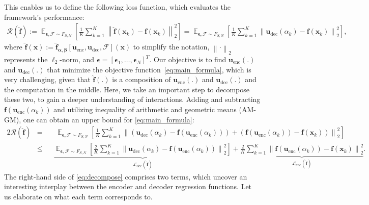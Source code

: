 \documentclass{article}
\def\enc{\mathbf{u}_\textrm{enc}}
\def\dec{\mathbf{u}_\textrm{dec}}
\def\lenc{\mathcal{L}_\textrm{enc}}
\def\ldec{\mathcal{L}_\textrm{dec}}
\def\func{\mathbf{f}}
\def\stset{\mathcal{F}}
\def\fhat{\mathbf{\hat{f}}}
\def\est{\fhat_{\bm{\alpha},\bm{\beta}}[\enc, \dec, \stset]}
\newcommand{\norm}[1]{\left\lVert#1\right\rVert}
\begin{document}
This enables us to define the following loss function, which evaluates the framework's performance:
\begin{align}\label{eq:main_formula}
    \mathcal{R}(\fhat) := \mathop{\mathbb{E}}_{\bm{\epsilon}, \stset \sim 
    F_{S,N}} \left[\frac{1}{K} \sum^K_{k=1} \norm{\fhat(\mathbf{x}_k) - \func(\mathbf{x}_k)}^2_2\right]
=\mathop{\mathbb{E}}_{\bm{\epsilon}, \stset \sim 
F_{S,N}} \left[\frac{1}{K}
    \sum^K_{k=1} \norm{\dec(\alpha_k)- \func(\mathbf{x}_k)}^2_2\right],
\end{align}
where $\fhat(\mathbf{x}) := \est(\mathbf{x})$ to simplify the notation, $\norm{\cdot}_2$ represents  the $\ell_2$-norm, and $\bm{\epsilon} = [\bm{\epsilon}_1,\dots, \bm{\epsilon}_N]^T$. Our objective is to find $\enc(.)$ and $\dec(.)$ that minimize the objective function~\eqref{eq:main_formula}, which is  very challenging, given that $\fhat(.)$ is a composition of $\enc(.)$ and $\dec(.)$ and the computation in the middle. Here, we take an important step to decompose these two, to gain a deeper understanding of interactions.
Adding and subtracting $ \func(\enc(\alpha_k))$ and utilizing inequality of arithmetic and geometric means (AM-GM), one can obtain an upper bound for \eqref{eq:main_formula}:
\begin{alignat}{2}
    \label{eq:decompose}
   \mathcal{R}(\fhat) &= &&~\mathop{\mathbb{E}}_{\bm{\epsilon}, \stset \sim F_{S,N}} \left[\frac{1}{K}
     \sum^K_{k=1} \norm{(\dec(\alpha_k)- \func(\enc(\alpha_k)))+ (\func(\enc(\alpha_k)) - \func(\mathbf{x}_k))}^2_2\right] \nonumber \\
    &\leqslant &&\underbrace{\mathop{\mathbb{E}}_{\bm{\epsilon}, \stset \sim F_{S,N}} \left[\frac{2}{K} \sum^K_{k=1} \norm{\dec \left(\alpha_k\right) - \func \left(\enc\left(\alpha_k\right)\right)}^2_2\right]}_{\ldec(\fhat)} +  \underbrace{\frac{2}{K} \sum^K_{k=1} \norm{\func(\enc(\alpha_k)) - \func(\mathbf{x}_k)}^2_2}_{\lenc(\fhat)}.
\end{alignat}
The right-hand side of \eqref{eq:decompose} comprises two terms, which uncover an interesting interplay between the encoder and decoder regression functions. Let us elaborate on what each term corresponds to.
\end{document}
